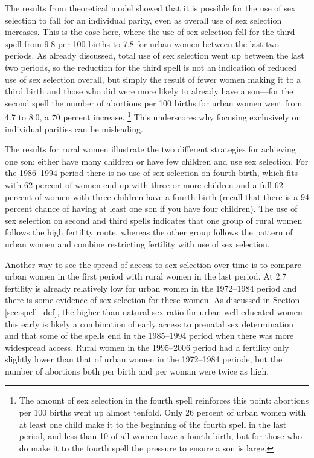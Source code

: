 \documentclass[12pt,letterpaper]{article}
\begin{document}
The results from theoretical model showed that it is possible for the use of sex 
selection to fall for an individual parity, even as overall use of sex selection 
increases. 
This is the case here, where the use of sex selection fell for the third spell 
from 9.8 per 100 births to 7.8 for urban women between the last two periods.
As already discussed, total use of sex selection went up between the last two
periods, so the reduction for the third spell is not an indication of reduced 
use of sex selection overall, but simply the result of fewer women making it to a 
third birth and those who did were more likely to already have a son---for 
the second spell the number of abortions per 100 births for urban women 
went from 4.7 to 8.0, a 70 percent increase.%
\footnote{
The amount of sex selection in the fourth spell reinforces this point:
abortions per 100 births went up almost tenfold.
Only 26 percent of urban women with at least one child make it to the beginning 
of the fourth spell in the last period, and less than 10 of all women have a fourth birth, 
but for those who do make it to the fourth spell the pressure to ensure a son is large.
}
This underscores why focusing exclusively on individual parities can be misleading.

The results for rural women illustrate the two different strategies for achieving one
son: either have many children or have few children and use sex selection.
For the 1986--1994 period there is no use of sex selection on fourth birth, which fits
with 62 percent of women end up with three or more children and a full 62 percent of women with 
three children have a fourth birth (recall that there is a 94 percent chance of having at 
least one son if you have four children).
The use of sex selection on second and third spells indicates that one group of rural
women follows the high fertility route, whereas the other group follows the pattern of
urban women and combine restricting fertility with use of sex selection.

Another way to see the spread of access to sex selection over time is to compare
urban women in the first period with rural women in the last period.
At 2.7 fertility is already relatively low for urban women in the 1972--1984 period and 
there is some evidence of sex selection for these women.
As discussed in Section \ref{sec:spell_def}, the higher than natural sex ratio for
urban well-educated women this early is likely a combination of early access to prenatal
sex determination and that some of the spells end in the 1985--1994 period when there 
was more widespread access.
Rural women in the 1995--2006 period had a fertility only slightly lower than that
of urban women in the 1972--1984 periode, but the number of abortions both per birth and 
per woman were twice as high.
\end{document}
